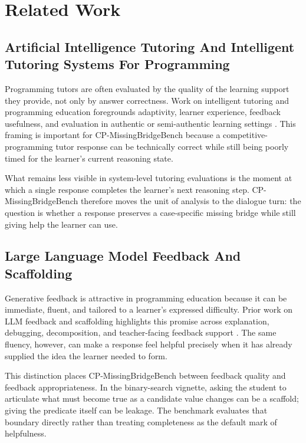 \documentclass[11pt]{article}
\begin{document}
\section{Related Work}

\subsection{Artificial Intelligence Tutoring And Intelligent Tutoring Systems For Programming}

Programming tutors are often evaluated by the quality of the learning support they provide, not only by answer correctness. Work on intelligent tutoring and programming education foregrounds adaptivity, learner experience, feedback usefulness, and evaluation in authentic or semi-authentic learning settings \citep{chrysafiadi2023fuzzyITS,wang2023realContextITS,gong2025genAIDFProgramming,guner2025chatgptProgramming}. This framing is important for CP-MissingBridgeBench because a competitive-programming tutor response can be technically correct while still being poorly timed for the learner's current reasoning state.

What remains less visible in system-level tutoring evaluations is the moment at which a single response completes the learner's next reasoning step. CP-MissingBridgeBench therefore moves the unit of analysis to the dialogue turn: the question is whether a response preserves a case-specific missing bridge while still giving help the learner can use.

\subsection{Large Language Model Feedback And Scaffolding}

Generative feedback is attractive in programming education because it can be immediate, fluent, and tailored to a learner's expressed difficulty. Prior work on LLM feedback and scaffolding highlights this promise across explanation, debugging, decomposition, and teacher-facing feedback support \citep{gong2025genAIDFProgramming,guo2024chatgptTeacherFeedback,ma2025dbox}. The same fluency, however, can make a response feel helpful precisely when it has already supplied the idea the learner needed to form.

This distinction places CP-MissingBridgeBench between feedback quality and feedback appropriateness. In the binary-search vignette, asking the student to articulate what must become true as a candidate value changes can be a scaffold; giving the predicate itself can be leakage. The benchmark evaluates that boundary directly rather than treating completeness as the default mark of helpfulness.
\end{document}
